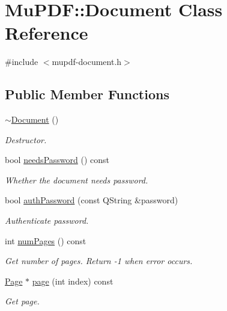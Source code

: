 \hypertarget{class_mu_p_d_f_1_1_document}{\section{Mu\-P\-D\-F\-:\-:Document Class Reference}
\label{class_mu_p_d_f_1_1_document}
}


{\ttfamily \#include $<$mupdf-\/document.\-h$>$}

\subsection*{Public Member Functions}
\begin{DoxyCompactItemize}
\item 
\hyperlink{class_mu_p_d_f_1_1_document_a5fc2b6668a9809a9e97fc84d1820117b}{$\sim$\-Document} ()
\begin{DoxyCompactList}\small\item\em Destructor. \end{DoxyCompactList}\item 
bool \hyperlink{class_mu_p_d_f_1_1_document_a1a13ec739fa4ead2caeb317c433c1756}{needs\-Password} () const 
\begin{DoxyCompactList}\small\item\em Whether the document needs password. \end{DoxyCompactList}\item 
bool \hyperlink{class_mu_p_d_f_1_1_document_a5d447dc019e82e7d6c55ee3d55a1a496}{auth\-Password} (const Q\-String \&password)
\begin{DoxyCompactList}\small\item\em Authenticate password. \end{DoxyCompactList}\item 
int \hyperlink{class_mu_p_d_f_1_1_document_aa45c6ede18c2d65cd151ba2759732c60}{num\-Pages} () const 
\begin{DoxyCompactList}\small\item\em Get number of pages. Return -\/1 when error occurs. \end{DoxyCompactList}\item 
\hyperlink{class_mu_p_d_f_1_1_page}{Page} $\ast$ \hyperlink{class_mu_p_d_f_1_1_document_ab54358660c0054f821728d32fa9fb1ad}{page} (int index) const 
\begin{DoxyCompactList}\small\item\em Get page. \end{DoxyCompactList}\item 

\end{DoxyCompactItemize}
